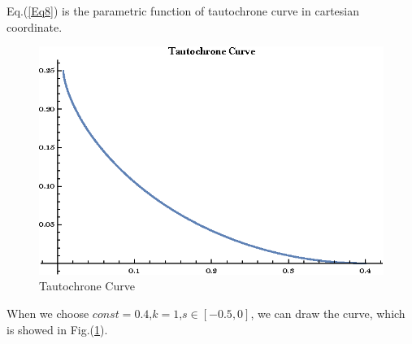 \documentclass[%
 reprint,
 amsmath,amssymb,
 aps,
]{revtex4-1}
\begin{document}
Eq.(\ref{Eq8}) is the parametric function of tautochrone curve in cartesian coordinate.
\begin{figure}
    \centering
    \includegraphics[scale=0.9]{tautochrone.eps}
    \caption{Tautochrone Curve}
    \label{fig2}
\end{figure}
When we choose $const=0.4$,$k=1$,$s\in[-0.5,0]$, we can draw the curve, which is showed in Fig.(\ref{fig2}).
\end{document}
